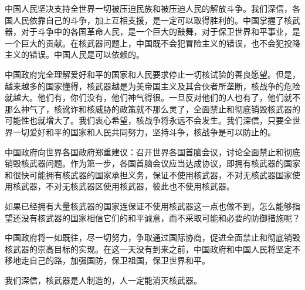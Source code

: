 中国人民坚决支持全世界一切被压迫民族和被压迫人民的解放斗争。我们深信，各国人民依靠自己的斗争，加上互相支援，是一定可以取得胜利的。中国掌握了核武器，对于斗争中的各国革命人民，是一个巨大的鼓舞，对于保卫世界和平事业，是一个巨大的贡献。在核武器问题上，中国既不会犯冒险主义的错误，也不会犯投降主义的错误。中国人民是可以依赖的。

中国政府完全理解爱好和平的国家和人民要求停止一切核试验的善良愿望。但是，越来越多的国家懂得，核武器越是为美帝国主义及其合伙者所垄断，核战争的危险就越大。他们有，你们没有，他们神气得很。一旦反对他们的人也有了，他们就不那么神气了，核讹诈和核威胁的政策就不那么灵了，全面禁止和彻底销毁核武器的可能性也就增大了。我们衷心希望，核战争将永远不会发生。我们深信，只要全世界一切爱好和平的国家和人民共同努力，坚持斗争，核战争是可以防止的。

中国政府向世界各国政府郑重建议：召开世界各国首脑会议，讨论全面禁止和彻底销毁核武器问题。作为第一步，各国首脑会议应当达成协议，即拥有核武器的国家和很快可能拥有核武器的国家承担义务，保证不使用核武器，不对无核武器国家使用核武器，不对无核武器区使用核武器，彼此也不使用核武器。

如果已经拥有大量核武器的国家连保证不使用核武器这一点也做不到，怎么能够指望还没有核武器的国家相信它们的和平诚意，而不采取可能和必要的防御措施呢？

中国政府将一如既往，尽一切努力，争取通过国际协商，促进全面禁止和彻底销毁核武器的崇高目标的实现。在这一天没有到来之前，中国政府和中国人民将坚定不移地走自己的路，加强国防，保卫祖国，保卫世界和平。

我们深信，核武器是人制造的，人一定能消灭核武器。
